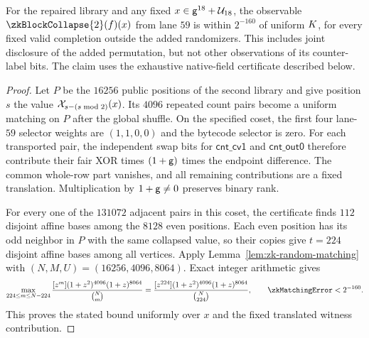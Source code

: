 \begin{theorem}\label{thm:zk-flock-matching-projection}
For the repaired library and any fixed $x\in\mathsf{g}^{18}+\mathcal{U}_{18}$, the observable $\zkBlockCollapse{2}(f)(x)$ from lane $59$ is within $2^{-160}$ of uniform $K$, for every fixed valid completion outside the added randomizers. This includes joint disclosure of the added permutation, but not other observations of its counter-label bits. The claim uses the exhaustive native-field certificate described below.
\end{theorem}
\begin{proof}
Let $P$ be the $16256$ public positions of the second library and give position $s$ the value $\mathcal{X}_{s-(s\bmod2)}(x)$. Its $4096$ repeated count pairs become a uniform matching on $P$ after the global shuffle. On the specified coset, the first four lane-$59$ selector weights are $(1,1,0,0)$ and the bytecode selector is zero. For each transported pair, the independent swap bits for $\mathsf{cnt\_cv1}$ and $\mathsf{cnt\_out0}$ therefore contribute their fair XOR times $(1+\mathsf{g})$ times the endpoint difference. The common whole-row part vanishes, and all remaining contributions are a fixed translation. Multiplication by $1+\mathsf{g}\ne0$ preserves binary rank.

For every one of the $131072$ adjacent pairs in this coset, the certificate finds $112$ disjoint affine bases among the $8128$ even positions. Each even position has its odd neighbor in $P$ with the same collapsed value, so their copies give $t=224$ disjoint affine bases among all vertices. Apply Lemma~\ref{lem:zk-random-matching} with $(N,M,U)=(16256,4096,8064)$. Exact integer arithmetic gives
\[
 \max_{224\le m\le N-224}
 \frac{[z^m](1+z^2)^{4096}(1+z)^{8064}}{\binom Nm}
 =\frac{[z^{224}](1+z^2)^{4096}(1+z)^{8064}}{\binom N{224}},
 \qquad \zkMatchingError<2^{-160}.
\]
This proves the stated bound uniformly over $x$ and the fixed translated witness contribution.
\end{proof}

